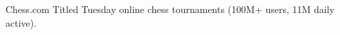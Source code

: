 \documentclass[preview]{standalone}
\begin{document}
Chess.com Titled Tuesday online chess tournaments (100M+ users, 11M daily active).\\
\end{document}
